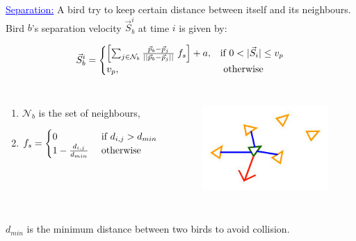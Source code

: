 \documentclass{beamer}
\begin{document}
\begin{frame}
\textcolor{blue}{\underline{Separation:}}
A bird try to keep certain distance between itself and
its neighbours. Bird $b$'s separation velocity $\vec{S}_b^i$ at time $i$ is given
by:


\begin{equation}
\vec{S}_b^i = 
	\begin{cases}
	 \left[\sum_{j \in \mathcal{N}_b}{\frac{\vec{p}_b -
\vec{p}_j}{||\vec{p}_b - \vec{p}_j||}} \;f_s\right] + a ,&\mbox{if } 0 < |\vec{S}_i|
\leq v_p\\
		v_p, &\mbox{ otherwise }  \notag
	\end{cases}
\end{equation}

\begin{columns}

\begin{enumerate}
\item \(\mathcal{N}_b\) is the set of neighbours, %
\item $
	f_s = \begin{cases}
	0 &\mbox{ if }  d_{i,j} > d_{min}\\
	1 - \frac{d_{i,j}}{d_{min}} &\mbox{ otherwise} \notag
	\end{cases}$
\end{enumerate}

\begin{figure}[h!]
		\includegraphics[scale=0.4]{images/separation}
		\label{fig:vFOV}
\end{figure}	


\end{columns}


$d_{min}$ is the minimum distance between two birds to avoid collision.
\end{frame}
\end{document}
